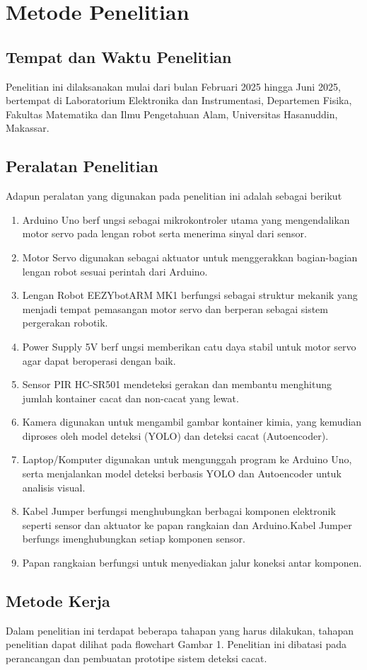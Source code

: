 \chapter{Metode Penelitian}
\section{Tempat dan Waktu Penelitian}
Penelitian ini dilaksanakan mulai dari bulan Februari 2025 hingga Juni
2025, bertempat di Laboratorium Elektronika dan Instrumentasi,
Departemen Fisika, Fakultas Matematika dan Ilmu Pengetahuan Alam,
Universitas Hasanuddin, Makassar. \\

\section{Peralatan Penelitian}
Adapun peralatan yang digunakan pada penelitian ini adalah sebagai berikut
\begin{enumerate}
  \item Arduino Uno berf ungsi sebagai mikrokontroler utama yang
    mengendalikan motor servo pada lengan robot serta menerima sinyal
    dari sensor.
  \item Motor Servo digunakan sebagai aktuator untuk menggerakkan
    bagian-bagian lengan robot sesuai perintah dari Arduino.
  \item Lengan Robot EEZYbotARM MK1 berfungsi sebagai struktur
    mekanik yang menjadi tempat pemasangan motor servo dan berperan
    sebagai sistem pergerakan robotik.
  \item Power Supply 5V berf ungsi memberikan catu daya stabil untuk
    motor servo agar dapat beroperasi dengan baik.
  \item Sensor PIR HC-SR501 mendeteksi gerakan dan membantu
    menghitung jumlah kontainer cacat dan non-cacat yang lewat.
  \item Kamera digunakan untuk mengambil gambar kontainer kimia, yang
    kemudian diproses oleh model deteksi (YOLO) dan deteksi cacat (Autoencoder).
  \item Laptop/Komputer digunakan untuk mengunggah program ke Arduino
    Uno, serta menjalankan model deteksi berbasis YOLO dan
    Autoencoder untuk analisis visual.
  \item Kabel Jumper berfungsi menghubungkan berbagai komponen
    elektronik seperti sensor dan aktuator ke papan rangkaian dan
    Arduino.Kabel Jumper berfungs imenghubungkan setiap komponen sensor.
  \item Papan rangkaian berfungsi untuk menyediakan jalur koneksi
    antar komponen. \\
\end{enumerate}

\section{Metode Kerja}
Dalam penelitian ini terdapat beberapa tahapan yang harus dilakukan,
tahapan penelitian dapat dilihat pada flowchart Gambar 1. Penelitian
ini dibatasi pada perancangan dan pembuatan prototipe sistem deteksi cacat.
